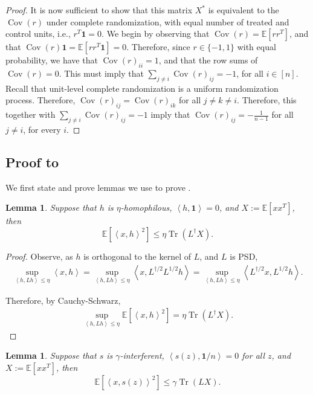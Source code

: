 \documentclass[12pt]{article}
\newtheorem{lemma}[theorem]{Lemma}
\theoremstyle{definition}
\numberwithin{equation}{section}
\numberwithin{figure}{section}
\newcommand\dotp[1]{\left\langle #1 \right\rangle}
\newcommand{\cov}{\operatorname{Cov}}
\numberwithin{equation}{section}
\numberwithin{figure}{section}
\begin{document}
\begin{proof}[Proof]
    It is now sufficient to show that this matrix $X^*$ is equivalent to the $\cov(r)$ under complete randomization, with equal number of treated and control units, i.e., $r^T \mathbf{1} = 0$. We begin by observing that $\cov(r) = \mathbb{E}[rr^T]$, and that $\cov(r) \mathbf{1} = \mathbb{E}[rr^T \mathbf{1}] = 0$. Therefore, since $r \in \{-1,1\}$ with equal probability, we have that $\cov(r)_{ii} = 1$, and that the row sums of $\cov(r) = 0$. This must imply that $\sum_{j \neq i} \cov(r)_{ij} = -1$, for all $i \in [n]$. Recall that unit-level complete randomization is a uniform randomization process. Therefore, $\cov(r)_{ij} = \cov(r)_{ik}$ for all $j \neq k \neq i$. Therefore, this together with $\sum_{j \neq i} \cov(r)_{ij} = -1$ imply that $\cov(r)_{ij} = -\frac{1}{n-1}$ for all $j \neq i$, for every $i$.
\end{proof}

\subsection{Proof to } \label{proof_mse_bound_general_HT}

We first state and prove lemmas we use to prove .

\begin{lemma} \label{lemma:homophily_bd}
    Suppose that $h$ is $\eta$-homophilous, $\dotp{h, \mathbf{1}} = 0$, and $X:= \mathbb{E}[xx^T]$, then
    \[
    \mathbb{E}[\dotp{x, h}^2] \leq \eta\operatorname{Tr}(L^{\dagger}X).
    \]
\end{lemma}

\begin{proof}
    Observe, as $h$ is orthogonal to the kernel of $L$, and $L$ is PSD,
    \begin{align*}
       \sup_{\dotp{h, Lh} \leq \eta} \dotp{x, h} = \sup_{\dotp{h, Lh} \leq \eta} \dotp{x, L^{\dagger/2} L^{1/2}h} =  \sup_{\dotp{h, Lh} \leq \eta} \dotp{L^{\dagger/2}x, L^{1/2}h}.
    \end{align*}

    Therefore, by Cauchy-Schwarz, 
    \begin{align*}
       \sup_{\dotp{h, Lh} \leq \eta}  \mathbb{E}[\dotp{x, h}^2] = \eta\operatorname{Tr}(L^{\dagger}X).
    \end{align*}
\end{proof}


\begin{lemma} \label{lemma:interference_bd}
    Suppose that $s$ is $\gamma$-interferent, $\dotp{s(z), \mathbf{1}/n} = 0$ for all $z$, and $X:= \mathbb{E}[xx^T]$, then
    \[
    \mathbb{E}[\dotp{x, s(z)}^2] \leq \gamma\operatorname{Tr}(LX).
    \]
\end{lemma}
\end{document}
